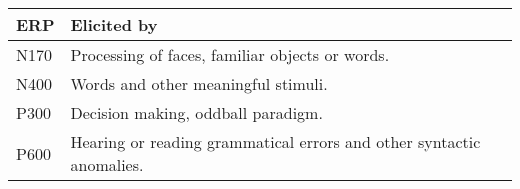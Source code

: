\begin{tabular}{ll}
    \toprule
    ERP & Elicited by
    \\
    \midrule
    N170 & Processing of faces, familiar objects or words.
    \\
    N400 & Words and other meaningful stimuli.
    \\
    P300 & Decision making, oddball paradigm.
    \\
    P600 & Hearing or reading grammatical errors and other syntactic anomalies.
    \\
    \bottomrule
\end{tabular}
